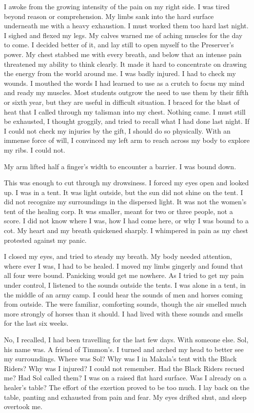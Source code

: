 \documentclass{article}
\begin{document}
I awoke from the growing intensity of the pain on my right side. I was tired beyond reason or comprehension. My limbs sank into the hard surface underneath me with a heavy exhaustion. I must worked them too hard last night. I sighed and flexed my legs. My calves warned me of aching muscles for the day to come. I decided better of it, and lay still to open myself to the Preserver's power. My chest stabbed me with every breath, and below that an intense pain threatened my ability to think clearly. It made it hard to concentrate on drawing the energy from the world around me. I was badly injured. I had to check my wounds. I mouthed the words I had learned to use as a crutch to focus my mind and ready my muscles. Most students outgrow the need to use them by their fifth or sixth year, but they are useful in difficult situation. I braced for the blast of heat that I called through my talisman into my chest. Nothing came. I must still be exhausted, I thought groggily, and tried to recall what I had done last night. If I could not check my injuries by the gift, I should do so physically. With an immense force of will, I convinced my left arm to reach across my body to explore my ribs. I could not.

My arm lifted half a finger's width to encounter a barrier. I was bound down.

This was enough to cut through my drowsiness. I forced my eyes open and looked up. I was in a tent. It was light outside, but the sun did not shine on the tent. I did not recognize my surroundings in the dispersed light. It was not the women's tent of the healing corp. It was smaller, meant for two or three people, not a score. I did not know where I was, how I had come here, or why I was bound to a cot. My heart and my breath quickened sharply. I whimpered in pain as my chest protested against my panic.

I closed my eyes, and tried to steady my breath. My body needed attention, where ever I was, I had to be healed. I moved my limbs gingerly and found that all four were bound. Panicking would get me nowhere. As I tried to get my pain under control, I listened to the sounds outside the tents. I was alone in a tent, in the middle of an army camp. I could hear the  sounds of men and horses coming from outside. The were familiar, comforting sounds, though the air smelled much more strongly of horses than it should. I had lived with these sounds and smells for the last six weeks. 

No, I recalled, I had been travelling for the last few days. With someone else. Sol, his name was. A friend of Timmon's. I turned and arched my head to  better see my surroundings. Where was Sol? Why was I in Makala's tent with the Black Riders? Why was I injured? I could not remember. Had the Black Riders recued me? Had Sol called them? I was on a raised flat hard surface. Was I already on a healer's table? The effort of the exertion proved to be too much. I lay back on the table, panting and exhausted from pain and fear. My eyes drifted shut, and sleep overtook me.
\end{document}
